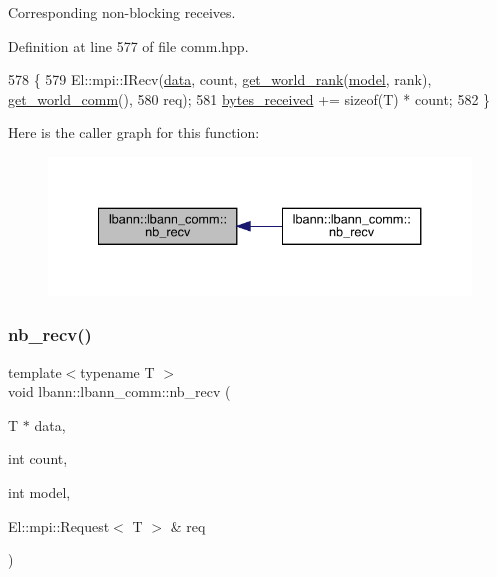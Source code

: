 Corresponding non-\/blocking receives. 

Definition at line 577 of file comm.\+hpp.


\begin{DoxyCode}
578                                                            \{
579     El::mpi::IRecv(\hyperlink{namespacelbann_1_1cnpy__utils_a9ac86d96ccb1f8b4b2ea16441738781f}{data}, count, \hyperlink{classlbann_1_1lbann__comm_ab3b1ebe8b72575094405eb2e37bb447d}{get\_world\_rank}(\hyperlink{namespacelbann_adee41f31f15f3906cbdcce4a1417eb56a20f35e630daf44dbfa4c3f68f5399d8c}{model}, rank), 
      \hyperlink{classlbann_1_1lbann__comm_a0493f1f0c42b95674daacf5288fdb073}{get\_world\_comm}(),
580                req);
581     \hyperlink{classlbann_1_1lbann__comm_afb99f57f7eafc0695bf28e6c26a8120f}{bytes\_received} += \textcolor{keyword}{sizeof}(T) * count;
582   \}
\end{DoxyCode}
Here is the caller graph for this function\+:\nopagebreak
\begin{figure}[H]
\begin{center}
\leavevmode
\includegraphics[width=334pt]{classlbann_1_1lbann__comm_aac24e8802602c73efddb455274e158f4_icgraph}
\end{center}
\end{figure}
\mbox{\label{classlbann_1_1lbann__comm_ad75e65db156edd86efa26ef1986668d0}} 
\subsubsection{\texorpdfstring{nb\+\_\+recv()}{nb\_recv()}\hspace{0.1cm}{\footnotesize\ttfamily [2/9]}}
{\footnotesize\ttfamily template$<$typename T $>$ \\
void lbann\+::lbann\+\_\+comm\+::nb\+\_\+recv (\begin{DoxyParamCaption}\item[{T $\ast$}]{data,  }\item[{int}]{count,  }\item[{int}]{model,  }\item[{El\+::mpi\+::\+Request$<$ T $>$ \&}]{req }\end{DoxyParamCaption})\hspace{0.3cm}{\ttfamily [inline]}}



